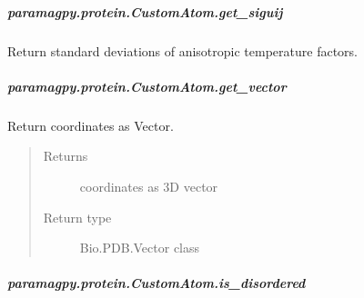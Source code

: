 \documentclass[a4paper,10pt,english]{sphinxmanual}
\begin{document}
\begin{fulllineitems}
\begin{fulllineitems}
\subparagraph{paramagpy.protein.CustomAtom.get\_siguij}
\label{\detokenize{reference/generated/paramagpy.protein.CustomAtom.get_siguij:paramagpy-protein-customatom-get-siguij}}\label{\detokenize{reference/generated/paramagpy.protein.CustomAtom.get_siguij::doc}}

\begin{fulllineitems}
\label{\detokenize{reference/generated/paramagpy.protein.CustomAtom.get_siguij:paramagpy.protein.CustomAtom.get_siguij}}
Return standard deviations of anisotropic temperature factors.

\end{fulllineitems}



\subparagraph{paramagpy.protein.CustomAtom.get\_vector}
\label{\detokenize{reference/generated/paramagpy.protein.CustomAtom.get_vector:paramagpy-protein-customatom-get-vector}}\label{\detokenize{reference/generated/paramagpy.protein.CustomAtom.get_vector::doc}}

\begin{fulllineitems}
\label{\detokenize{reference/generated/paramagpy.protein.CustomAtom.get_vector:paramagpy.protein.CustomAtom.get_vector}}
Return coordinates as Vector.
\begin{quote}\begin{description}
\item[{Returns}] \leavevmode
coordinates as 3D vector

\item[{Return type}] \leavevmode
Bio.PDB.Vector class

\end{description}\end{quote}

\end{fulllineitems}



\subparagraph{paramagpy.protein.CustomAtom.is\_disordered}
\label{\detokenize{reference/generated/paramagpy.protein.CustomAtom.is_disordered:paramagpy-protein-customatom-is-disordered}}\label{\detokenize{reference/generated/paramagpy.protein.CustomAtom.is_disordered::doc}}


\end{fulllineitems}
\end{fulllineitems}
\end{document}
